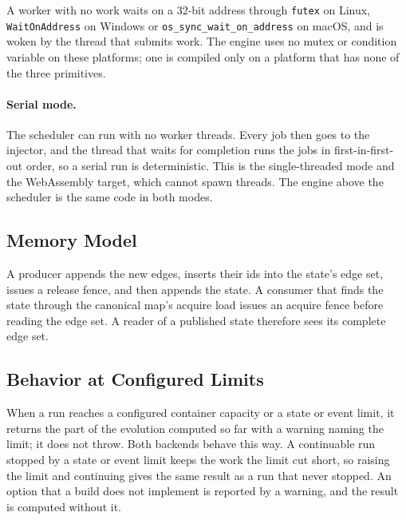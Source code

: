 \documentclass[9pt,twocolumn,a4paper]{extarticle}
\begin{document}
A worker with no work waits on a 32-bit address through \texttt{futex} on Linux,
\texttt{WaitOnAddress} on Windows or \texttt{os\_sync\_wait\_on\_address} on macOS, and is woken by
the thread that submits work. The engine uses no mutex or condition variable on these platforms;
one is compiled only on a platform that has none of the three primitives.

\paragraph{Serial mode.}
The scheduler can run with no worker threads. Every job then goes to the injector, and the thread
that waits for completion runs the jobs in first-in-first-out order, so a serial run is
deterministic. This is the single-threaded mode and the WebAssembly target, which cannot spawn
threads. The engine above the scheduler is the same code in both modes.

\subsection{Memory Model}

A producer appends the new edges, inserts their ids into the state's edge set, issues a release
fence, and then appends the state. A consumer that finds the state through the canonical map's
acquire load issues an acquire fence before reading the edge set. A reader of a published state therefore
sees its complete edge set.

\subsection{Behavior at Configured Limits}
\label{sec:capacity}

When a run reaches a configured container capacity or a state or event limit, it returns the part
of the evolution computed so far with a warning naming the limit; it does not throw. Both backends
behave this way. A continuable run stopped by a state or event limit keeps the work the limit cut
short, so raising the limit and continuing gives the same result as a run that never stopped. An option that a build does not
implement is reported by a warning, and the result is computed without it.
\end{document}
